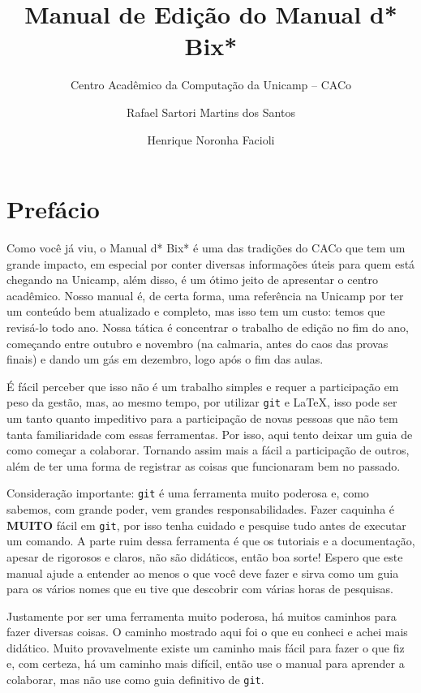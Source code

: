 \documentclass[a4paper,oneside,10pt]{memoir}
\title{Manual de Edição do Manual d* Bix*}
\author{
  Centro Acadêmico da Computação da Unicamp -- CACo
  \and
  Rafael Sartori Martins dos Santos
  \and
  Henrique Noronha Facioli
}
\date{\the\year}
\begin{document}
\maketitle

\frontmatter
\tableofcontents

\chapter{Prefácio}

Como você já viu, o Manual d* Bix* é uma das tradições do CACo que tem um
grande impacto, em especial por conter diversas informações úteis para quem
está chegando na Unicamp, além disso, é um ótimo jeito de apresentar o centro
acadêmico. Nosso manual é, de certa forma, uma referência na Unicamp por ter um
conteúdo bem atualizado e completo, mas isso tem um custo: temos que revisá-lo
todo ano. Nossa tática é concentrar o trabalho de edição no fim do ano,
começando entre outubro e novembro (na calmaria, antes do caos das provas
finais) e dando um gás em dezembro, logo após o fim das aulas.

É fácil perceber que isso não é um trabalho simples e requer a participação em
peso da gestão, mas, ao mesmo tempo, por utilizar \texttt{git} e \LaTeX, isso
pode ser um tanto quanto impeditivo para a participação de novas pessoas que
não tem tanta familiaridade com essas ferramentas. Por isso, aqui tento deixar
um guia de como começar a colaborar. Tornando assim mais a fácil a participação
de outros, além de ter uma forma de registrar as coisas que funcionaram bem no
passado.

Consideração importante: \texttt{git} é uma ferramenta muito poderosa e, como
sabemos, com grande poder, vem grandes responsabilidades. Fazer caquinha é
\textbf{MUITO} fácil em \texttt{git}, por isso tenha cuidado e pesquise tudo
antes de executar um comando. A parte ruim dessa ferramenta é que os tutoriais
e a documentação, apesar de rigorosos e claros, não são didáticos, então boa
sorte! Espero que este manual ajude a entender ao menos o que você deve fazer e
sirva como um guia para os vários nomes que eu tive que descobrir com várias
horas de pesquisas.

Justamente por ser uma ferramenta muito poderosa, há muitos caminhos para fazer
diversas coisas. O caminho mostrado aqui foi o que eu conheci e achei mais
didático. Muito provavelmente existe um caminho mais fácil para fazer o que fiz
e, com certeza, há um caminho mais difícil, então use o manual para aprender a
colaborar, mas não use como guia definitivo de \texttt{git}.
\end{document}
